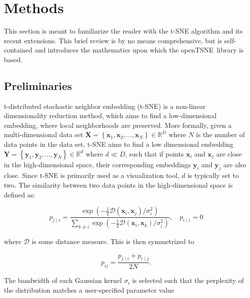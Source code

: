 \documentclass[twocolumn]{bmcart}
\newcommand{\opentsne}{\textsf{openTSNE}}
\begin{document}
\section*{Methods}

This section is meant to familiarize the reader with the t-SNE algorithm and
its recent extensions. This brief review is by no means comprehensive, but is
self-contained and introduces the mathematics upon which the \opentsne\ library
is based.

\subsection*{Preliminaries}

t-distributed stochastic neighbor embedding (t-SNE) is a non-linear
dimensionality reduction method, which aims to find a low-dimensional
embedding, where local neighborhoods are preserved. More formally, given a
multi-dimensional data set $\mathbf{X} = \left \{ \mathbf{x}_1, \mathbf{x}_2,
\dots, \mathbf{x}_N \right \} \in \mathbb{R}^D$ where $N$ is the number of data
points in the data set, t-SNE aims to find a low dimensional embedding
$\mathbf{Y} = \left \{ \mathbf{y}_1, \mathbf{y}_2, \dots, \mathbf{y}_N \right
\} \in \mathbb{R}^d$ where $d \ll D$, such that if points $\mathbf{x}_i$ and
$\mathbf{x}_j$ are close in the high-dimensional space, their corresponding
embeddings $\mathbf{y}_i$ and $\mathbf{y}_j$ are also close. Since t-SNE is
primarily used as a visualization tool, $d$ is typically set to two. The
similarity between two data points in the high-dimensional space is defined as:

\begin{equation}
p_{j \mid i} = \frac{\exp \left ( -\frac{1}{2} \mathcal{D}(\mathbf{x}_i, \mathbf{x}_j ) / \sigma_i^2 \right )}
{\sum_{k \neq i } \exp \left ( -\frac{1}{2} \mathcal{D}(\mathbf{x}_i, \mathbf{x}_k ) / \sigma_i^2 \right )}, \quad p_{i \mid i} = 0
\label{eq:gaussian_kernel}
\end{equation}

\noindent where $\mathcal{D}$ is some distance measure. This is then
symmetrized to

\begin{equation}
p_{ij} = \frac{p_{j \mid i} + p_{i \mid j}}{2N}.
\label{eq:symmetrize}
\end{equation}

The bandwidth of each Gaussian kernel $\sigma_i$ is selected such that the
perplexity of the distribution matches a user-specified parameter value
\end{document}
